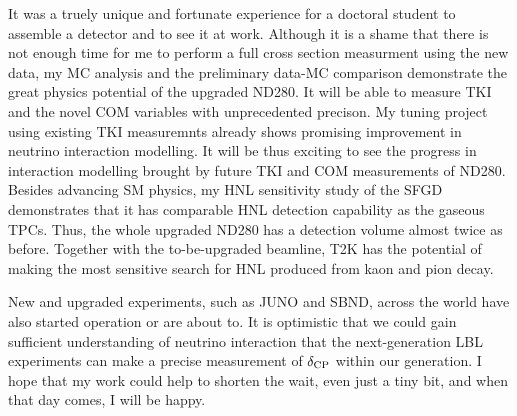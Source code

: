 It was a truely unique and fortunate experience for a doctoral student to assemble a detector and to see it at work.
Although it is a shame that there is not enough time for me to perform a full cross section measurment using the new data, my MC analysis and the preliminary data-MC comparison demonstrate the great physics potential of the upgraded ND280. 
It will be able to measure TKI and the novel COM variables with unprecedented precison.
My tuning project using existing TKI measuremnts already shows promising improvement in neutrino interaction modelling.
It will be thus exciting to see the progress in interaction modelling brought by future TKI and COM measurements of ND280.
Besides advancing SM physics, my HNL sensitivity study of the SFGD demonstrates that it has comparable HNL detection capability as the gaseous TPCs. 
Thus, the whole upgraded ND280 has a detection volume almost twice as before.
Together with the to-be-upgraded beamline, T2K has the potential of making the most sensitive search for HNL produced from kaon and pion decay.

New and upgraded experiments, such as JUNO and SBND, across the world have also started operation or are about to.
It is optimistic that we could gain sufficient understanding of neutrino interaction that the next-generation LBL experiments can make a precise measurement of $\delta_\textrm{CP}$ within our generation.
I hope that my work could help to shorten the wait, even just a tiny bit, and when that day comes, I will be happy.